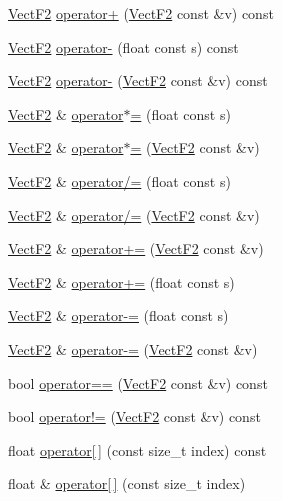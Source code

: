 \begin{DoxyCompactItemize}
\item 
\hyperlink{classVectF2}{Vect\-F2} \hyperlink{classVectF2_a5e6153ad038c8d09882d8ea1abc1d317}{operator+} (\hyperlink{classVectF2}{Vect\-F2} const \&v) const 
\item 
\hyperlink{classVectF2}{Vect\-F2} \hyperlink{classVectF2_ad472b6dfc859c5b9c4b3c4307c12bffc}{operator-\/} (float const s) const 
\item 
\hyperlink{classVectF2}{Vect\-F2} \hyperlink{classVectF2_a89a5fe1c34408eef9e89166d4b35e499}{operator-\/} (\hyperlink{classVectF2}{Vect\-F2} const \&v) const 
\item 
\hyperlink{classVectF2}{Vect\-F2} \& \hyperlink{classVectF2_aab9e0720aa8c5a3949ea41063ab770d7}{operator$\ast$=} (float const s)
\item 
\hyperlink{classVectF2}{Vect\-F2} \& \hyperlink{classVectF2_a140457ce391949e9dc49c81841298e1b}{operator$\ast$=} (\hyperlink{classVectF2}{Vect\-F2} const \&v)
\item 
\hyperlink{classVectF2}{Vect\-F2} \& \hyperlink{classVectF2_a5d4831b7f65e2f38beb2d8eb290d646d}{operator/=} (float const s)
\item 
\hyperlink{classVectF2}{Vect\-F2} \& \hyperlink{classVectF2_afd131590e4f31b49b5f1ec0df9a88f57}{operator/=} (\hyperlink{classVectF2}{Vect\-F2} const \&v)
\item 
\hyperlink{classVectF2}{Vect\-F2} \& \hyperlink{classVectF2_a4017adf0af196003e608dc3bc5c2c7ca}{operator+=} (\hyperlink{classVectF2}{Vect\-F2} const \&v)
\item 
\hyperlink{classVectF2}{Vect\-F2} \& \hyperlink{classVectF2_a5e3fa5d0641587f49afb92449bc80ce2}{operator+=} (float const s)
\item 
\hyperlink{classVectF2}{Vect\-F2} \& \hyperlink{classVectF2_a286f88ce5a9f6cc464966b69a84bb507}{operator-\/=} (float const s)
\item 
\hyperlink{classVectF2}{Vect\-F2} \& \hyperlink{classVectF2_a8fd30844795871fafde43172e2e73746}{operator-\/=} (\hyperlink{classVectF2}{Vect\-F2} const \&v)
\item 
bool \hyperlink{classVectF2_a831233ec28e0b0ff54bc8a7ad13d22cc}{operator==} (\hyperlink{classVectF2}{Vect\-F2} const \&v) const 
\item 
bool \hyperlink{classVectF2_a7bb57e4b1ca9284d4bffdf84378e7796}{operator!=} (\hyperlink{classVectF2}{Vect\-F2} const \&v) const 
\item 
float \hyperlink{classVectF2_ac82792affb423392bf79a59484ccc902}{operator\mbox{[}$\,$\mbox{]}} (const size\-\_\-t index) const 
\item 
float \& \hyperlink{classVectF2_a76c57290a9593aeeea7ef1504ffae38a}{operator\mbox{[}$\,$\mbox{]}} (const size\-\_\-t index)
\end{DoxyCompactItemize}

